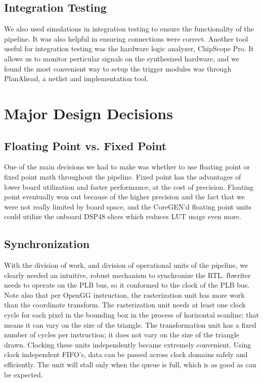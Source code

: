\documentclass[letterpaper,10pt]{article}
\begin{document}
\subsection{Integration Testing}
We also used simulations in integration testing to ensure the functionality of the pipeline.  It was also helpful in ensuring connections were correct.  Another tool useful for integration testing was the hardware logic analyzer, ChipScope Pro.  It allows us to monitor perticular signals on the synthesized hardware, and we found the most convenient way to setup the trigger modules was through PlanAhead, a netlist and implementation tool.  

\section{Major Design Decisions}

\subsection{Floating Point vs. Fixed Point}
One of the main decisions we had to make was whether to use floating point or fixed point math throughout the pipeline. Fixed point has the advantages of lower board utilization and faster performance, at the cost of precision. Floating point eventually won out because of the higher precision and the fact that we were not really limited by board space, and the CoreGEN'd floating point units could utilize the onboard DSP48 slices which reduces LUT usage even more.

\subsection{Synchronization}
With the division of work, and division of operational units of the pipeline, we clearly needed an intuitive, robust mechanism to synchronize the RTL.  fbwriter needs to operate on the PLB bus, so it conformed to the clock of the PLB bus.  Note also that per OpenGG instruction, the rasterization unit has more work than the coordinate transform.  The rasterization unit needs at least one clock cycle for each pixel in the bounding box in the process of horizontal scanline; that means it can vary on the size of the triangle.  The transformation unit has a fixed number of cycles per instruction; it does not vary on the size of the triangle drawn.  Clocking these units independently became extremely convenient.  Using clock independent FIFO's, data can be passed across clock domains safely and efficiently.  The unit will stall only when the queue is full, which is as good as can be expected.
\end{document}
